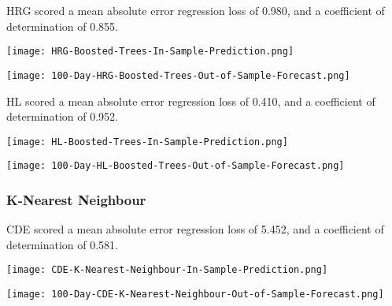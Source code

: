 HRG scored a mean absolute error regression loss of 0.980, and a coefficient of determination of 0.855.

\begin{center}
    \texttt{[image: HRG-Boosted-Trees-In-Sample-Prediction.png]}
    \label{fig:nonfloat}
\end{center}

\begin{center}  
    \texttt{[image: 100-Day-HRG-Boosted-Trees-Out-of-Sample-Forecast.png]}
    \label{fig:nonfloat}
\end{center}

HL scored a mean absolute error regression loss of 0.410, and a coefficient of determination of 0.952.

\begin{center}
    \texttt{[image: HL-Boosted-Trees-In-Sample-Prediction.png]}
    \label{fig:nonfloat}
\end{center}

\begin{center}  
    \texttt{[image: 100-Day-HL-Boosted-Trees-Out-of-Sample-Forecast.png]}
    \label{fig:nonfloat}
\end{center}

\subsubsection{K-Nearest Neighbour}

CDE scored a mean absolute error regression loss of 5.452, and a coefficient of determination of 0.581.

\begin{center}
    \texttt{[image: CDE-K-Nearest-Neighbour-In-Sample-Prediction.png]}
    \label{fig:nonfloat}
\end{center}

\begin{center}  
    \texttt{[image: 100-Day-CDE-K-Nearest-Neighbour-Out-of-Sample-Forecast.png]}
    \label{fig:nonfloat}
\end{center}

